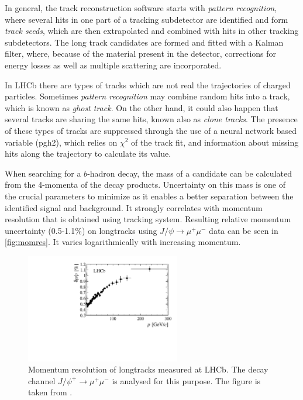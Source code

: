 In general, the track reconstruction software starts with \textit{pattern recognition}, where several hits in one part of a tracking subdetector are identified and form \textit{track seeds}, which are then extrapolated and combined with hits in other tracking subdetectors. The long track candidates are formed and fitted with a Kalman filter\cite{Hierk:684697}, where, because of the material present in the detector, corrections for energy losses as well as multiple scattering are incorporated.

In \gls{LHCb} there are types of tracks which are not real the trajectories of charged particles.
Sometimes \textit{pattern recognition} may combine random hits into a track, which is known as \textit{ghost track}. On the other hand, it could also happen that several tracks are sharing the same hits, known also as \textit{clone tracks}. The presence of these types of tracks are suppressed through the use of a neural network based variable (\Gls{pgh2}), which relies on $\chi^{2}$ of the track fit, and information about missing hits along the trajectory to calculate its value.

When searching for a $b$-hadron decay, the mass of a candidate can be calculated from the 4-momenta of the decay products. Uncertainty on this mass is one of the crucial parameters to minimize as it enables a better separation between the identified signal and background. It strongly correlates with momentum resolution that is obtained using tracking system. Resulting relative momentum uncertainty (0.5-1.1\%) on \gls{longtrack}s using $J/\psi \rightarrow \mu^{+} \mu^{-}$ data can be seen in \autoref{fig:momres}. It varies logarithmically with increasing momentum.


\begin{figure}[!h]
	\centering
	\includegraphics[width = 0.6\textwidth]{figs/detector/Fig17.pdf}
	\caption{Momentum resolution of \gls{longtrack}s measured at \gls{LHCb}. The decay channel $J/\psi^{+} \rightarrow \mu^{+} \mu^{-}$ is analysed for this purpose. The figure is taken from \cite{LHCb-DP-2014-002}.}
	\label{fig:momres}
\end{figure}

